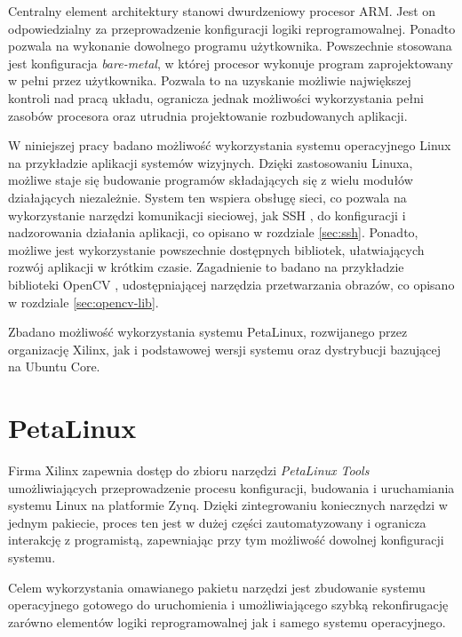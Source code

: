 Centralny element architektury stanowi dwurdzeniowy procesor ARM. 
Jest on odpowiedzialny za przeprowadzenie konfiguracji logiki reprogramowalnej. 
Ponadto pozwala na wykonanie dowolnego programu użytkownika. 
Powszechnie stosowana jest konfiguracja \textit{bare-metal}, w której procesor wykonuje program zaprojektowany w pełni przez użytkownika. 
Pozwala to na uzyskanie możliwie największej kontroli nad pracą układu, ogranicza jednak możliwości wykorzystania pełni zasobów procesora oraz utrudnia projektowanie rozbudowanych aplikacji.

W niniejszej pracy badano możliwość wykorzystania systemu operacyjnego Linux na przykładzie aplikacji systemów wizyjnych. 
Dzięki zastosowaniu Linuxa, możliwe staje się budowanie programów składających się z wielu modułów działających niezależnie. 
System ten wspiera obsługę sieci, co pozwala na wykorzystanie narzędzi komunikacji sieciowej, jak SSH \cite{ssh-protocol}, do konfiguracji i nadzorowania działania aplikacji, co opisano w rozdziale \ref{sec:ssh}. 
Ponadto, możliwe jest wykorzystanie powszechnie dostępnych bibliotek, ułatwiających rozwój aplikacji w krótkim czasie. 
Zagadnienie to badano na przykładzie biblioteki OpenCV \cite{opencv-library}, udostępniającej narzędzia przetwarzania obrazów, co opisano w rozdziale \ref{sec:opencv-lib}.

Zbadano możliwość wykorzystania systemu PetaLinux, rozwijanego przez organizację Xilinx, jak i podstawowej wersji systemu oraz dystrybucji bazującej na Ubuntu Core. %


\section{PetaLinux} %

Firma Xilinx zapewnia dostęp do zbioru narzędzi \emph{PetaLinux Tools} \cite{petalinux-tools} umożliwiających przeprowadzenie procesu konfiguracji, budowania i uruchamiania systemu Linux na platformie Zynq. 
Dzięki zintegrowaniu koniecznych narzędzi w jednym pakiecie, proces ten jest w dużej części zautomatyzowany i ogranicza interakcję z programistą, zapewniając przy tym możliwość dowolnej konfiguracji systemu.

Celem wykorzystania omawianego pakietu narzędzi jest zbudowanie systemu operacyjnego gotowego do uruchomienia i umożliwiającego szybką rekonfirugację zarówno elementów logiki reprogramowalnej jak i samego systemu operacyjnego.

